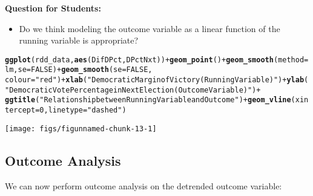\documentclass[11pt,leqno]{article}\usepackage[]{graphicx}\usepackage[]{color}
\makeatletter
\newcommand{\hlnum}[1]{\textcolor[rgb]{0.686,0.059,0.569}{#1}}%
\newcommand{\hlstr}[1]{\textcolor[rgb]{0.192,0.494,0.8}{#1}}%
\newcommand{\hlopt}[1]{\textcolor[rgb]{0,0,0}{#1}}%
\newcommand{\hlstd}[1]{\textcolor[rgb]{0.345,0.345,0.345}{#1}}%
\newcommand{\hlkwc}[1]{\textcolor[rgb]{0.333,0.667,0.333}{#1}}%
\newcommand{\hlkwd}[1]{\textcolor[rgb]{0.737,0.353,0.396}{\textbf{#1}}}%
\newenvironment{kframe}{%
 \def\at@end@of@kframe{}%
 \ifinner\ifhmode%
  \def\at@end@of@kframe{\end{minipage}}%
  \begin{minipage}{\columnwidth}%
 \fi\fi%
 \def\FrameCommand##1{\hskip\@totalleftmargin \hskip-\fboxsep
 \colorbox{shadecolor}{##1}\hskip-\fboxsep
     \hskip-\linewidth \hskip-\@totalleftmargin \hskip\columnwidth}%
 \MakeFramed {\advance\hsize-\width
   \@totalleftmargin\z@ \linewidth\hsize
   \@setminipage}}%
 {\par\unskip\endMakeFramed%
 \at@end@of@kframe}
\newenvironment{knitrout}{}{} %
\theoremstyle{newstyle}
\makeatother
\begin{document}
\vspace{5mm}
\begin{mdframed}
\textbf{Question for Students:}
\vspace{-5mm}
\begin{itemize}\itemsep1pt
\item Do we think modeling the outcome variable as a linear function of the running variable is appropriate?
\end{itemize}
\end{mdframed}

\begin{knitrout}\footnotesize
{}\color{fgcolor}\begin{kframe}
\begin{alltt}
\hlkwd{ggplot}\hlstd{(rdd_data,} \hlkwd{aes}\hlstd{(DifDPct, DPctNxt))} \hlopt{+} \hlkwd{geom_point}\hlstd{()} \hlopt{+} \hlkwd{geom_smooth}\hlstd{(}\hlkwc{method} \hlstd{= lm,} \hlkwc{se} \hlstd{=} \hlnum{FALSE}\hlstd{)} \hlopt{+} \hlkwd{geom_smooth}\hlstd{(}\hlkwc{se} \hlstd{=} \hlnum{FALSE}\hlstd{,}
    \hlkwc{colour} \hlstd{=} \hlstr{"red"}\hlstd{)} \hlopt{+} \hlkwd{xlab}\hlstd{(}\hlstr{"Democratic Margin of Victory (Running Variable)"}\hlstd{)} \hlopt{+} \hlkwd{ylab}\hlstd{(}\hlstr{"Democratic Vote Percentage in Next Election (Outcome Variable)"}\hlstd{)} \hlopt{+}
    \hlkwd{ggtitle}\hlstd{(}\hlstr{"Relationship between Running Variable and Outcome"}\hlstd{)} \hlopt{+} \hlkwd{geom_vline}\hlstd{(}\hlkwc{xintercept} \hlstd{=} \hlnum{0}\hlstd{,} \hlkwc{linetype} \hlstd{=} \hlstr{"dashed"}\hlstd{)}
\end{alltt}
\end{kframe}
\texttt{[image: figs/figunnamed-chunk-13-1]} 

\end{knitrout}

\subsection{Outcome Analysis}

We can now perform outcome analysis on the detrended outcome variable:
\end{document}
